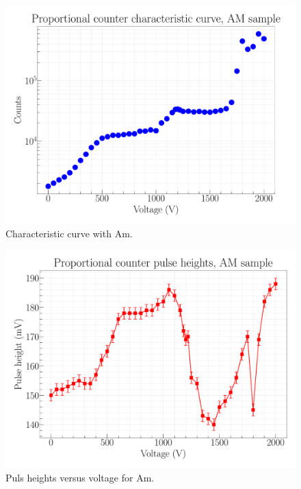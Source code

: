 \begin{figure}[H]
\centering
\includegraphics[width=\textwidth]{../Figures/Proportional_characteristic_curve_AM.pdf}
\caption{Characteristic curve with Am.}
\label{fig:AmChar}
\end{figure}

\begin{figure}[H]
\centering
\includegraphics[width=\textwidth]{../Figures/Proportional_pulse_heights_AM.pdf}
\caption{Puls heights versus voltage for Am.}
\label{fig:AmPH}
\end{figure}

